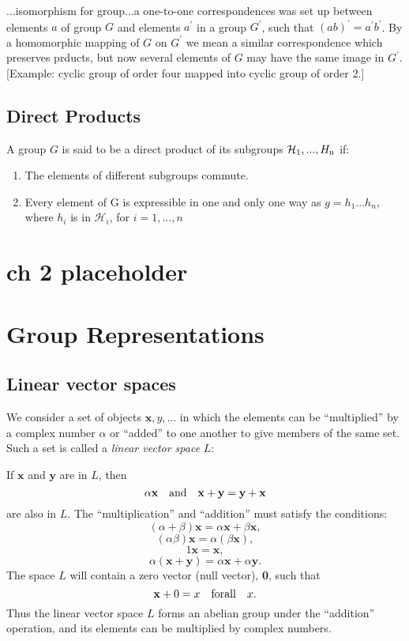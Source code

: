 \documentclass{book}
\begin{document}
...isomorphism for group...a one-to-one correspondences was set up
between elements $a$ of group $G$ and elements $a^\prime$ in a group
$G^\prime$, such that $(ab)^\prime = a^\prime b^\prime$. By a
homomorphic mapping of $G$ on $G^\prime$ we mean a similar
correspondence which preserves prducts, but now several elements of
$G$ may have the same image in $G^\prime$. [Example: cyclic group of
  order four mapped into cyclic group of order 2.]

\section{Direct Products}

A group $G$ is said to be a direct product of its subgroups ${\mathcal H_{\rm 1},...,H_{\rm n}}$ if:

\begin{enumerate}
\item The elements of different subgroups commute.
\item Every element of G is expressible in one and only one way as
  $g = h_1...h_n$, where $h_i$ is in ${\mathcal H}_i$, for $i = 1,...,n$
\end{enumerate}

\chapter{ch 2 placeholder}

\chapter{Group Representations}

\section{Linear vector spaces}

\def\bx{\mathbf x}
\def\by{\mathbf y}

We consider a set of objects ${\mathbf x,y,...}$ in which the elements
can be ``multiplied'' by a complex number $\alpha$ or ``added'' to one
another to give members of the same set. Such a set is called a {\it
  linear vector space} $L$:

If $\bx$ and $\by$ are in $L$, then
$$
\alpha{\mathbf x} \quad {\rm and} \quad {\bx+\by = \by+\bx}
$$
are also in $L$. The ``multiplication'' and ``addition'' must satisfy the conditions:
$$(\alpha + \beta)\bx = \alpha\bx + \beta\bx,$$
$$(\alpha\beta)\bx = \alpha(\beta\bx),$$
$$1\bx = \bx,$$
$$\alpha(\bx+\by) = \alpha\bx + \alpha\by.$$
The space $L$ will contain a zero vector (null vector), {\bf 0}, such that
$$\mathbf x + 0 = x \quad {\rm for all} \quad x.$$
Thus the linear vector space $L$ forms an abelian group under the
``addition'' operation, and its elements can be multiplied by complex numbers.
\end{document}
